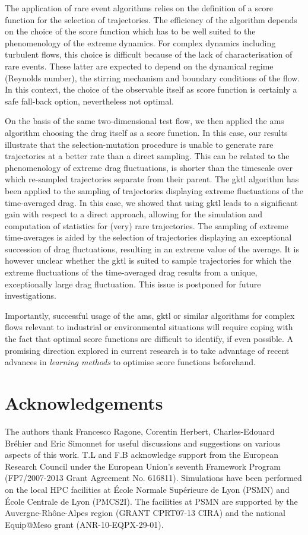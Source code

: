 \documentclass{jfm}
\newcommand{\EL}[1]{{\color{myred}{#1}}}
\begin{document}
The application of rare event algorithms relies on the definition of a score function for the selection of trajectories.
The efficiency of the algorithm depends on the choice of the score function which has to be well suited to the phenomenology of the extreme dynamics.
For complex dynamics including turbulent flows, this choice is  difficult because of the lack of characterisation of rare events. These latter are expected to depend on the dynamical regime (Reynolds number), the stirring mechanism and boundary conditions of the flow. In this context, the choice of the observable itself as score function is certainly a safe fall-back option, nevertheless not optimal.

On the basis of the same two-dimensional test flow, we then applied the \ac{ams} algorithm choosing the drag itself as a score function.
In this case, our results illustrate that the selection-mutation procedure is unable to generate rare trajectories at a better rate than a direct sampling.
This can be related to the phenomenology of extreme drag fluctuations, \EL{whose lifetime} is shorter than the timescale over which re-sampled trajectories separate from their parent.
The \ac{gktl} algorithm has been applied to the sampling of trajectories displaying extreme fluctuations of the time-averaged drag.
In this case, we showed that using \ac{gktl} leads to a significant gain with respect to a direct approach, allowing for the simulation and computation of statistics for (very) rare trajectories.
The sampling of extreme time-averages is aided by the selection of trajectories displaying an exceptional succession of drag fluctuations, resulting in an extreme value of the average.
It is however unclear whether the \ac{gktl} is suited to sample trajectories for which the extreme fluctuations of the time-averaged drag results from a unique, exceptionally large drag fluctuation. This issue is postponed for future investigations.

Importantly, successful usage of the \ac{ams}, \ac{gktl} or similar algorithms for complex flows relevant to industrial or environmental situations will require coping with the fact that optimal score functions
are difficult to identify, if even possible.
A promising direction explored in current research is to take advantage of recent advances in \emph{learning methods} to optimise score functions beforehand.

\section{Acknowledgements}
The authors thank Francesco Ragone, Corentin Herbert, Charles-Edouard Bréhier and Eric Simonnet for useful discussions and suggestions on various aspects of this work.
T.L and F.B acknowledge support from the European Research Council under the European Union's seventh Framework Program (FP7/2007-2013 Grant Agreement No. 616811).
Simulations have been performed on the local HPC facilities at École Normale Supérieure de Lyon (PSMN) and École Centrale de Lyon (PMCS2I).
The facilities at PSMN are supported by the Auvergne-Rhône-Alpes region (GRANT CPRT07-13 CIRA) and the national Equip@Meso grant (ANR-10-EQPX-29-01).
\end{document}
